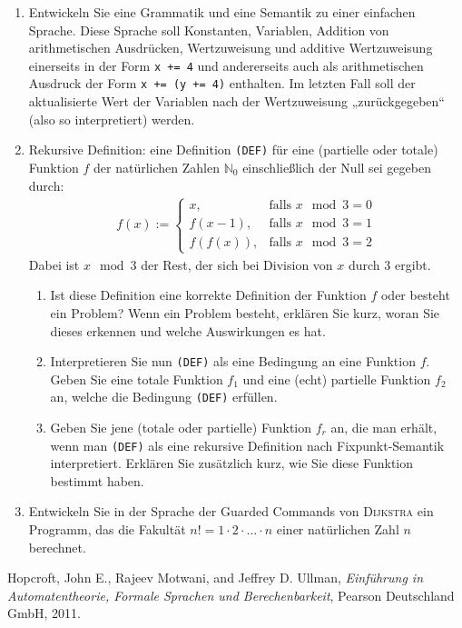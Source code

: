 \documentclass[
  a4paper,
  11pt,
]{scrartcl}
\newcommand{\N}{\mathbb{N}}
\begin{document}
\begin{enumerate}
  \item Entwickeln Sie eine Grammatik und eine Semantik zu einer einfachen
    Sprache. Diese Sprache soll Konstanten, Variablen, Addition von
    arithmetischen Ausdrücken, Wertzuweisung und additive Wertzuweisung
    einerseits in der Form \texttt{x += 4} und andererseits auch als
    arithmetischen Ausdruck der Form \texttt{x += (y += 4)} enthalten. Im
    letzten Fall soll der aktualisierte Wert der Variablen nach der
    Wertzuweisung „zurückgegeben“ (also so interpretiert) werden.

  \item Rekursive Definition: eine Definition \texttt{(DEF)} für eine (partielle
    oder totale) Funktion $f$ der natürlichen Zahlen $\N_0$ einschließlich der
    Null sei gegeben durch:
    \begin{align*}
      f(x) := \begin{cases}
        x,       & \text{falls } x \mod 3 = 0\\
        f(x-1),  & \text{falls } x \mod 3 = 1\\
        f(f(x)), & \text{falls } x \mod 3 = 2
      \end{cases}
    \end{align*}
    Dabei ist $x \mod 3$ der Rest, der sich bei Division von $x$ durch $3$
    ergibt.

    \begin{enumerate}
      \item Ist diese Definition eine korrekte Definition der Funktion $f$ oder
        besteht ein Problem? Wenn ein Problem besteht, erklären Sie kurz, woran
        Sie dieses erkennen und welche Auswirkungen es hat.

      \item Interpretieren Sie nun \texttt{(DEF)} als eine Bedingung an eine
        Funktion $f$. Geben Sie eine totale Funktion $f_1$ und eine (echt)
        partielle Funktion $f_2$ an, welche die Bedingung \texttt{(DEF)}
        erfüllen.

      \item Geben Sie jene (totale oder partielle) Funktion $f_r$ an, die man
        erhält, wenn man \texttt{(DEF)} als eine rekursive Definition nach
        Fixpunkt-Semantik interpretiert. Erklären Sie zusätzlich kurz, wie Sie
        diese Funktion bestimmt haben.
    \end{enumerate}

  \item Entwickeln Sie in der Sprache der Guarded Commands von \textsc{Dijkstra}
    ein Programm, das die Fakultät $n! = 1 \cdot 2 \cdot \ldots \cdot n$ einer
    natürlichen Zahl $n$ berechnet.
\end{enumerate}

\begin{thebibliography}{9}

  Hopcroft, John E., Rajeev Motwani, and Jeffrey D. Ullman,
  \emph{Einführung in Automatentheorie, Formale Sprachen und Berechenbarkeit},
  Pearson Deutschland GmbH,
  2011.

\end{thebibliography}
\end{document}
